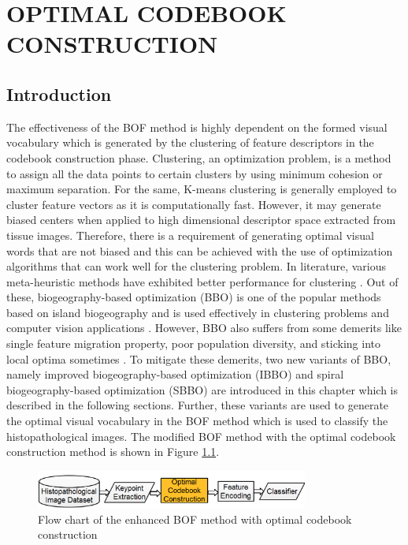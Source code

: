 

\chapter{OPTIMAL CODEBOOK CONSTRUCTION}\label{Ch4:codebookconstruction}
\graphicspath{{Chapter4/Chapter4Figs/}{Chapter4/Chapter4Figs/}}

\section{Introduction}\label{ch4:sec:Intro}


The effectiveness of the BOF method is highly dependent on the formed visual vocabulary which is generated by the clustering of feature descriptors in the codebook construction phase. Clustering, an optimization problem, is a method to assign all the data points to certain clusters by using minimum cohesion or maximum separation. For the same, K-means clustering is generally employed to cluster feature vectors as it is computationally fast. However, it may generate biased centers when applied to high dimensional descriptor space extracted from tissue images. Therefore, there is a requirement of generating optimal visual words that are not biased and this can be achieved with the use of optimization algorithms that can work well for the clustering problem.  In literature, various meta-heuristic methods have exhibited better performance for clustering  \cite{bong2012} \cite{ahmed2017}. Out of these, biogeography-based optimization (BBO) \cite{Simon2008} is one of the popular methods based on island biogeography and is used effectively in clustering problems and computer vision applications \cite{ma2017}. However, BBO also suffers from some demerits like single feature migration property, poor population diversity, and sticking into local optima sometimes \cite{lim2016}. To mitigate these demerits, two new variants of BBO, namely improved biogeography-based optimization (IBBO) and spiral biogeography-based optimization (SBBO) are introduced in this chapter which is described in the following sections. Further, these variants are used to generate the optimal visual vocabulary in the BOF method which is used to classify the histopathological images. The modified BOF method with the optimal codebook construction method is shown in Figure \ref{ch4:fig:codebook}.

\begin{figure}[h!]
            \centering
            \includegraphics[width=0.8\textwidth]{codebook}
            \caption[Flow chart of the BOF method with modified codebook construction]{\fontsize{10}{12} \selectfont Flow chart of the enhanced BOF method with optimal codebook construction}\label{ch4:fig:codebook}
\end{figure}

